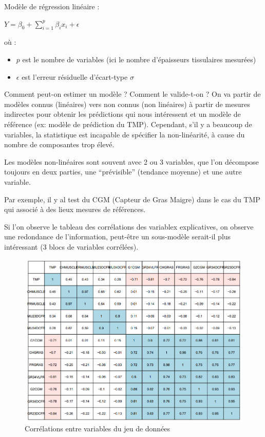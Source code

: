 \documentclass[
]{article}
\begin{document}
Modèle de régression linéaire :

\begin{center}
$Y =\beta_{0}+\sum_{i=1}^{p}\beta_{i}x_{i}+\epsilon$
\end{center}

où :

\begin{itemize}
\item
  \(p\) est le nombre de variables (ici le nombre d'épaisseurs
  tissulaires mesurées)
\item
  \(\epsilon\) est l'erreur résiduelle d'écart-type \(\sigma\)
\end{itemize}

Comment peut-on estimer un modèle ? Comment le valide-t-on ? On va
partir de modèles connus (linéaires) vers non connus (non linéaires) à
partir de mesures indirectes pour obtenir les prédictions qui nous
intéressent et un modèle de référence (ex: modèle de prédiction du TMP).
Cependant, s'il y a beaucoup de variables, la statistique est incapable
de spécifier la non-linéarité, à cause du nombre de composantes trop
élevé.

Les modèles non-linéaires sont souvent avec 2 ou 3 variables, que l'on
décompose toujours en deux parties, une ``prévisible'' (tendance
moyenne) et une autre variable.

Par exemple, il y al test du CGM (Capteur de Gras Maigre) dans le cas du
TMP qui associé à des lieux mesures de références.

Si l'on observe le tableau des corrélations des variablex explicatives,
on observe une redondance de l'information, peut-être un sous-modèle
serait-il plus intéressant (3 blocs de variables corrélées).

\begin{figure}
  \centering
  \includegraphics{Regression/Tableau-Correlation.png}
  \caption{Corrélations entre variables du jeu de données}
\end{figure}
\end{document}
